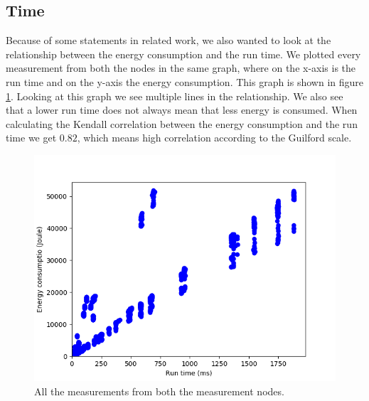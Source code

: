 \subsection{Time}
Because of some statements in related work, we also wanted to look at the relationship between the energy consumption and the run time. We plotted every measurement from both the nodes in the same graph, where on the x-axis is the run time and on the y-axis the energy consumption. This graph is shown in figure \ref{fig:time}. Looking at this graph we see multiple lines in the relationship. We also see that a lower run time does not always mean that less energy is consumed. When calculating the Kendall correlation between the energy consumption and the run time we get $0.82$, which means high correlation according to the Guilford scale.

\begin{figure}[h]
    \centering
    \includegraphics[width=.6\textwidth]{graphs/time.png}
    \caption{All the measurements from both the measurement nodes.}
    \label{fig:time}
\end{figure}



